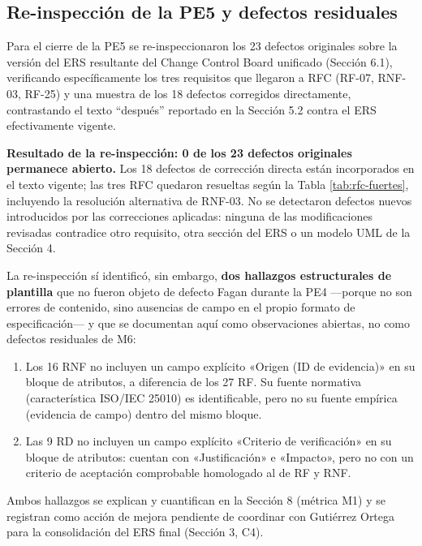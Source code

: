 \documentclass[11pt]{article}
\begin{document}
	\subsection{Re-inspección de la PE5 y defectos residuales}
	
	Para el cierre de la PE5 se re-inspeccionaron los 23 defectos originales sobre la versión del ERS resultante del Change Control Board unificado (Sección 6.1), verificando específicamente los tres requisitos que llegaron a RFC (RF-07, RNF-03, RF-25) y una muestra de los 18 defectos corregidos directamente, contrastando el texto ``después'' reportado en la Sección 5.2 contra el ERS efectivamente vigente.
	
	\textbf{Resultado de la re-inspección: 0 de los 23 defectos originales permanece abierto.} Los 18 defectos de corrección directa están incorporados en el texto vigente; las tres RFC quedaron resueltas según la Tabla \ref{tab:rfc-fuertes}, incluyendo la resolución alternativa de RNF-03. No se detectaron defectos nuevos introducidos por las correcciones aplicadas: ninguna de las modificaciones revisadas contradice otro requisito, otra sección del ERS o un modelo UML de la Sección 4.
	
	La re-inspección sí identificó, sin embargo, \textbf{dos hallazgos estructurales de plantilla} que no fueron objeto de defecto Fagan durante la PE4 ---porque no son errores de contenido, sino ausencias de campo en el propio formato de especificación--- y que se documentan aquí como observaciones abiertas, no como defectos residuales de M6:
	
	\begin{enumerate}
		\item Los 16 RNF no incluyen un campo explícito «Origen (ID de evidencia)» en su bloque de atributos, a diferencia de los 27 RF. Su fuente normativa (característica ISO/IEC 25010) es identificable, pero no su fuente empírica (evidencia de campo) dentro del mismo bloque.
		\item Las 9 RD no incluyen un campo explícito «Criterio de verificación» en su bloque de atributos: cuentan con «Justificación» e «Impacto», pero no con un criterio de aceptación comprobable homologado al de RF y RNF.
	\end{enumerate}
	
	Ambos hallazgos se explican y cuantifican en la Sección 8 (métrica M1) y se registran como acción de mejora pendiente de coordinar con Gutiérrez Ortega para la consolidación del ERS final (Sección 3, C4).
	
\end{document}
